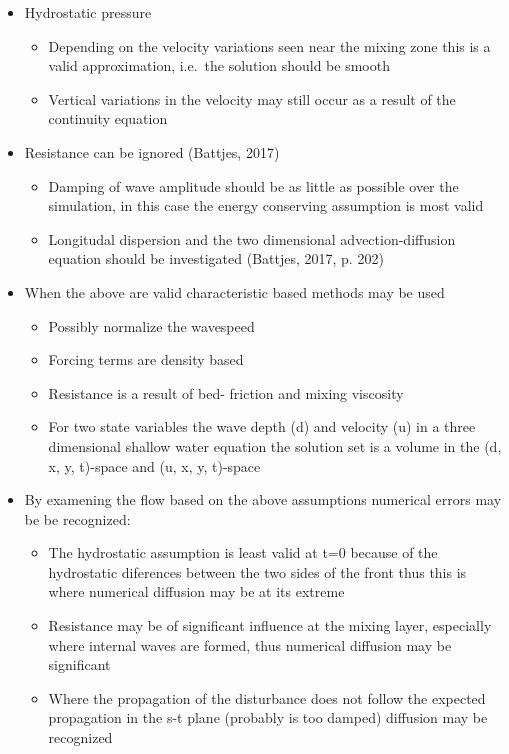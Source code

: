 \begin{itemize}
\tightlist
\item
  Hydrostatic pressure

  \begin{itemize}
  \tightlist
  \item
    Depending on the velocity variations seen near the mixing zone this
    is a valid approximation, i.e.~the solution should be smooth
  \item
    Vertical variations in the velocity may still occur as a result of
    the continuity equation
  \end{itemize}
\item
  Resistance can be ignored (Battjes, 2017)

  \begin{itemize}
  \tightlist
  \item
    Damping of wave amplitude should be as little as possible over the
    simulation, in this case the energy conserving assumption is most
    valid
  \item
    Longitudal dispersion and the two dimensional advection-diffusion
    equation should be investigated (Battjes, 2017, p. 202)
  \end{itemize}
\item
  When the above are valid characteristic based methods may be used

  \begin{itemize}
  \tightlist
  \item
    Possibly normalize the wavespeed
  \item
    Forcing terms are density based
  \item
    Resistance is a result of bed- friction and mixing viscosity
  \item
    For two state variables the wave depth (d) and velocity (u) in a
    three dimensional shallow water equation the solution set is a
    volume in the (d, x, y, t)-space and (u, x, y, t)-space
  \end{itemize}
\item
  By examening the flow based on the above assumptions numerical errors
  may be be recognized:

  \begin{itemize}
  \tightlist
  \item
    The hydrostatic assumption is least valid at t=0 because of the
    hydrostatic diferences between the two sides of the front thus this
    is where numerical diffusion may be at its extreme
  \item
    Resistance may be of significant influence at the mixing layer,
    especially where internal waves are formed, thus numerical diffusion
    may be significant
  \item
    Where the propagation of the disturbance does not follow the
    expected propagation in the s-t plane (probably is too damped)
    diffusion may be recognized
  \end{itemize}
\end{itemize}

